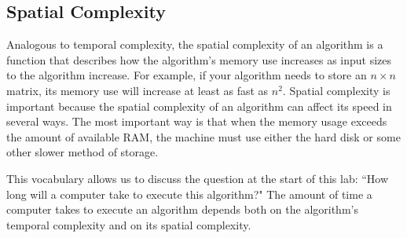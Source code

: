 \begin{comment}
\begin{table}
 \begin{tabular}{|c|l|l|} \hline Data Structure & $k\times k$ & Time (s) \\ \hline 
 Python List    & $10\times10$  & 0.0002758503 \\ 
 \cline{2-3}    & $100\times100$    & 0.1336028576 \\ 
 \cline{2-3}    & $1000\times1000$ & 200.4009799957 \\ 
\hline \hline 
 NumPy Array    & $10\times10$  & 0.0000109673 \\
 \cline{2-3}    & $100\times100$    & 0.0009210110 \\ 
 \cline{2-3}    & $1000\times1000$ & 2.1682999134 \\
 \hline \end{tabular}
 \caption{Time for one computer to square a $k \times k$ matrix in Python and NumPy.}
\label{table:square_times} 
\end{table} 
% 

NumPy is optimized for fast array computations.

\end{comment}


\subsection*{Spatial Complexity}
Analogous to temporal complexity, the spatial complexity of an algorithm is a function that describes how the algorithm's memory use increases as input sizes to the algorithm increase. For example, if your algorithm needs to store an $n \times n$ matrix, its memory use will increase at least as fast as $n^2$. Spatial complexity is important because  the spatial complexity of an algorithm can affect its speed in several ways. The most important way is that when the memory usage exceeds the amount of available RAM, the machine must use either the hard disk or some other slower method of storage.

This vocabulary allows us to discuss the question at the start of this lab: ``How long will a computer take to execute this algorithm?" The amount of time a computer takes to execute an algorithm depends both on the algorithm's temporal complexity and on its spatial complexity. 

